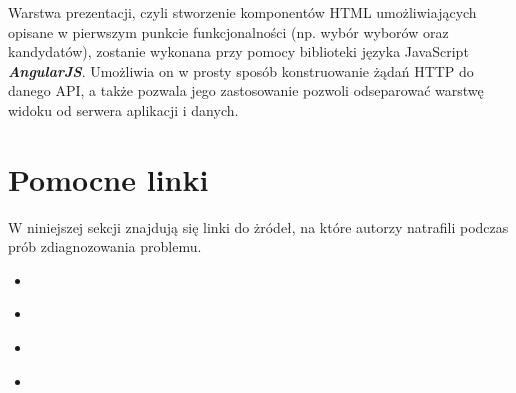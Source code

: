\documentclass[10pt,a4paper]{article}
\begin{document}
Warstwa prezentacji, czyli stworzenie komponentów HTML umożliwiających opisane w pierwszym punkcie funkcjonalności (np. wybór wyborów oraz kandydatów), zostanie wykonana przy pomocy biblioteki języka JavaScript \textit{\textbf{AngularJS}}. Umożliwia on w prosty sposób konstruowanie żądań HTTP do danego API, a także pozwala jego zastosowanie pozwoli odseparować warstwę widoku od serwera aplikacji i danych. 


\section{Pomocne linki}
W niniejszej sekcji znajdują się linki do żródeł, na które autorzy natrafili podczas prób zdiagnozowania problemu.
\begin{itemize}
\item \cite[Atrykuł przedstawiający ładowanie ShapeFile do bazy danych PostGIS]{loadShpDataIntoPostGis}
\item \cite[Atrykuł pokazujący obsługę GeoSerwera]{servepostgisdata1}
\item \cite[Wątek opisujący załadowanie pliku z bazą danych eESRI i konwersje fo Shapefile'a]{loadESRIDataAndConvertToShape}
\item \cite[Strona Wiki opisująca sposób ekstrakcji danych geograficznych do bazy postGisowej]{osmToPostGIS}
\end{itemize}
{}

\end{document}
